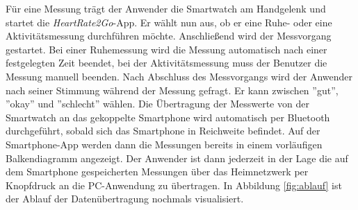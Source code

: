 Für eine Messung trägt der Anwender die Smartwatch am Handgelenk und startet die \textit{HeartRate2Go}-App. Er wählt nun aus, ob er eine Ruhe- oder eine Aktivitätsmessung durchführen möchte. Anschließend wird der Messvorgang gestartet. Bei einer Ruhemessung wird die Messung automatisch nach einer festgelegten Zeit beendet, bei der Aktivitätsmessung muss der Benutzer die Messung manuell beenden. 
Nach Abschluss des Messvorgangs wird der Anwender nach seiner Stimmung während der Messung gefragt. Er kann zwischen ''gut'', ''okay'' und ''schlecht'' wählen. Die Übertragung der Messwerte von der Smartwatch an das gekoppelte Smartphone wird automatisch per Bluetooth durchgeführt, sobald sich das Smartphone in Reichweite befindet. Auf der Smartphone-App werden dann die Messungen bereits in einem vorläufigen Balkendiagramm angezeigt. Der Anwender ist dann jederzeit in der Lage die auf dem Smartphone gespeicherten Messungen über das Heimnetzwerk per Knopfdruck an die PC-Anwendung zu übertragen. In Abbildung \ref{fig:ablauf} ist der Ablauf der Datenübertragung nochmals visualisiert.

